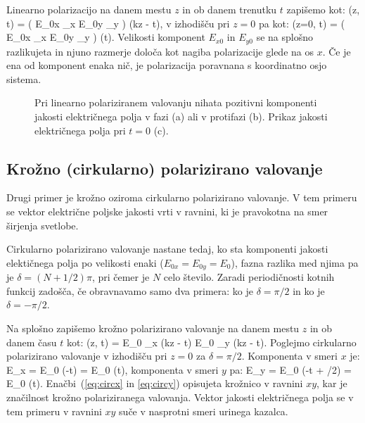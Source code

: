 Linearno polarizacijo na danem mestu $z$ in ob danem trenutku $t$ zapišemo
kot:
\beq
{} (z, t) = \left( E_{0x} _x \pm E_{0y} _y \right)
\cos \left(kz - \omega t\right)\!,
\label{eq:03_38}
\eeq
v izhodišču pri $z=0$ pa kot:
\beq
{} (z=0, t) = \left( E_{0x} _x \pm E_{0y} _y \right)
\cos \left(\omega t\right)\!.
\label{eq:03_39}
\eeq
Velikosti komponent $E_{x0}$ in $E_{y0}$ se na splošno razlikujeta in njuno razmerje
določa kot nagiba polarizacije glede na os $x$. Če je ena od komponent enaka nič, je 
polarizacija poravnana s koordinatno osjo sistema.

\begin{figure}[ht]
\centering
\def\svgwidth{140truemm} 

\caption{Pri linearno polariziranem valovanju nihata pozitivni komponenti jakosti
električnega polja v fazi (a) ali v protifazi (b). Prikaz jakosti električnega polja
pri $t=0$ (c).}
\label{fig:03_linpol}
\end{figure}

\subsection*{Krožno (cirkularno) polarizirano valovanje}
Drugi primer je krožno oziroma cirkularno polarizirano valovanje. V tem primeru
se vektor električne poljske jakosti vrti v ravnini, ki je pravokotna na smer 
širjenja svetlobe. 

Cirkularno polarizirano valovanje nastane tedaj, ko sta komponenti jakosti 
elektičnega polja po velikosti enaki ($E_{0x} = E_{0y} = E_0$), fazna razlika 
med njima pa je $\delta = (N+1/2) \pi$, pri čemer je $N$ celo število. 
Zaradi periodičnosti kotnih funkcij zadošča, 
če obravnavamo samo dva primera: ko je $\delta = \pi/2$ in ko je 
$\delta = - \pi/2$. 

Na splošno zapišemo krožno polarizirano valovanje
na danem mestu $z$ in ob danem času $t$ kot:
\beq
{} (z, t) = E_{0} _x \cos \left(kz - \omega t\right)
\pm E_{0} _y \sin \left(kz - \omega t\right)\!.
\label{eq:03_40}
\eeq
Poglejmo cirkularno polarizirano valovanje v izhodišču pri $z=0$ za 
$\delta = \pi/2$. Komponenta v smeri $x$ je:
\beq
E_x = E_0 \cos (-\omega t) = E_0 \cos (\omega t),
\label{eq:circx}
\eeq
komponenta v smeri $y$ pa:
\beq
E_y = E_0 \cos (-\omega t + \pi/2) = E_0 \sin (\omega t).
\label{eq:circy}
\eeq
Enačbi~(\ref{eq:circx} in \ref{eq:circy}) opisujeta krožnico v ravnini $xy$, 
kar je značilnost krožno polariziranega valovanja. Vektor jakosti
električnega polja se v tem primeru v ravnini $xy$ suče v nasprotni 
smeri urinega kazalca.

